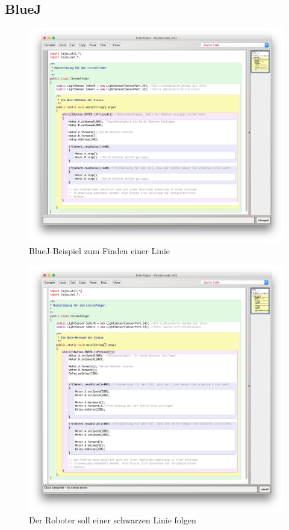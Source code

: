 \documentclass[paper=a4, pagesize, DIV=calc, BCOR=12.5mm, twoside=on, onecolumn=on, open = any, titlepage =on, parskip =half-, headsepline = on, footsepline = on, chapterprefix = on, appendixprefix = off, fontsize = 12pt, numbers = noenddot, abstract = on]{scrbook}
\numberwithin{equation}{chapter}
\theoremstyle{definition}
\theoremstyle{plain}
\theoremstyle{plain}
\theoremstyle{remark}
\theoremstyle{plain}
\theoremstyle{plain}
\begin{document}
\subsection{BlueJ}
\label{sec:bluej}
\begin{figure}[htbp]
\centering
\includegraphics[scale=0.35]{images/linienfinder_bluej.png} 
\caption{BlueJ-Beispiel zum Finden einer Linie}
\label{fig:Bsp BlueJ Linienfinder}
\end{figure}

\begin{figure}[htbp]
\centering
\includegraphics[scale=0.35]{images/linienfolger_bluej.png} 
\caption{Der Roboter soll einer schwarzen Linie folgen}
\label{fig:Bsp BlueJ Linienfolger}
\end{figure}
\end{document}
